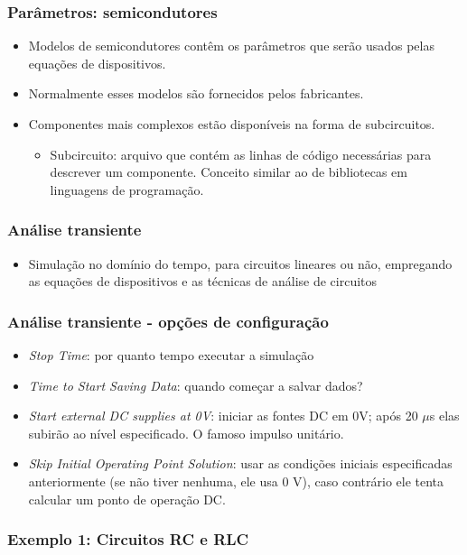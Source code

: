 \documentclass{beamer}
\begin{document}
\begin{frame}
\frametitle{Parâmetros: semicondutores}
\begin{itemize}
\item{Modelos de semicondutores contêm os parâmetros que serão usados pelas equações de dispositivos.}
\item{Normalmente esses modelos são fornecidos pelos fabricantes.}
\item{Componentes mais complexos estão disponíveis na forma de subcircuitos.}
\begin{itemize}
\item{Subcircuito}: arquivo que contém as linhas de código necessárias para descrever um componente. Conceito similar ao de bibliotecas em linguagens de programação.
\end{itemize}
\end{itemize}
\end{frame}


\begin{frame}
\frametitle{Análise transiente}
\begin{itemize}
\item{Simulação no domínio do tempo, para circuitos lineares ou não, empregando as equações de dispositivos e as técnicas de análise de circuitos}
\end{itemize}
\end{frame}

\begin{frame}
\frametitle{Análise transiente - opções de configuração}
\begin{itemize} 
\item \textit{Stop Time}: por quanto tempo executar a simulação
\item \textit{Time to Start Saving Data}: quando começar a salvar dados?
\item \textit{Start external DC supplies at 0V}: iniciar as fontes DC em 0V; após 20 $\mu$s elas subirão ao nível especificado. O famoso impulso unitário.
\item \textit{Skip Initial Operating Point Solution}: usar as condições iniciais especificadas anteriormente (se não tiver nenhuma, ele usa 0 V), caso contrário ele tenta calcular um ponto de operação DC.
\end{itemize}
\end{frame}

\begin{frame}
\frametitle{Exemplo 1: Circuitos RC e RLC}
\end{frame}
\end{document}
